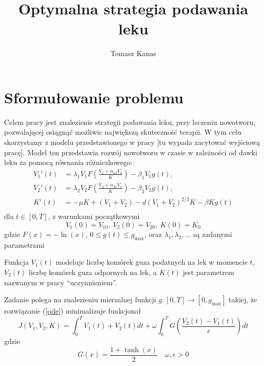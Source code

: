 \documentclass[11pt]{article}
\title{Optymalna strategia podawania leku}
\author{Tomasz Kanas}
\begin{document}
\maketitle

\section{Sformułowanie problemu}

Celem pracy jest znalezienie strategii podawania leku, przy leczeniu nowotworu, pozwalającej osiągnąć możliwie największą skuteczność terapii. W tym celu skorzystamy z modelu przedstawionego w pracy [tu wypada zacytować wyjściową pracę]. Model ten przedstawia rozwój nowotworu w czasie w zależności od dawki leku za pomocą równania różniczkowego:
\begin{equation} \label{ode}
  \begin{aligned} 
    V_1'(t) &= \lambda_1V_1F\left(\frac{V_1 + \alpha_{12}V_2}{K}\right) - \beta_1V_1g(t), \\
    V_2'(t) &= \lambda_2V_2F\left(\frac{V_2 + \alpha_{21}V_1}{K}\right) - \beta_2V_2g(t), \\
    K'(t) &= -\mu K + (V_1+V_2) - d{(V_1 + V_2)}^{2/3}K - \beta K g(t) \\
  \end{aligned}
\end{equation}
dla $t \in [0, T]$, z warunkami początkowymi
\begin{equation} \label{ode-start}
   V_1(0) = V_{10},\ V_2(0) = V_{20},\ K(0) = K_0
\end{equation}
gdzie $F(x) = -\ln(x)$, $ 0 \le g(t) \le g_{\max}$, oraz $\lambda_1, \lambda_2, \ldots$ są zadanymi parametrami

Funkcja $V_1(t)$ modeluje liczbę komórek guza podatnych na lek w momencie $t$, $V_2(t)$ liczbę komórek guza odpornych na lek, a $K(t)$ jest parametrem nazwanym w pracy ``uczynnieniem''.

Zadanie polega na znalezieniu mierzalnej funkcji $g: [0, T] \to [0, g_{\max}]$ takiej, że rozwiązanie (\ref{ode}) minimalizuje funkcjonał
\begin{equation} \label{objf}
  J(V_1, V_2, K) = \int_0^T V_1(t) + V_2(t)dt + \omega\int_0^T G\left(\frac{V_2(t) - V_1(t)}{\epsilon}\right) dt
\end{equation}
gdzie
\begin{equation*}
  G(x) = \frac{1+\tanh(x)}{2} \quad
  \omega, \epsilon > 0 
\end{equation*}
\end{document}
